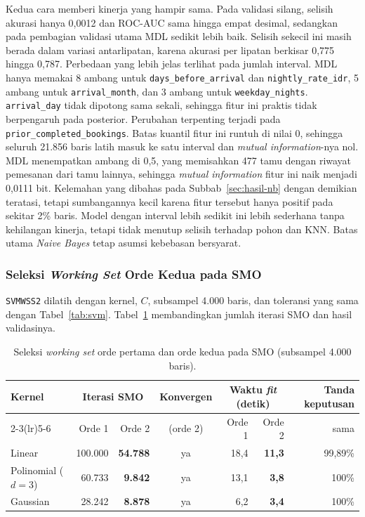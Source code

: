 Kedua cara memberi kinerja yang hampir sama. Pada validasi silang, selisih akurasi hanya 0,0012 dan ROC-AUC sama hingga empat desimal, sedangkan pada pembagian validasi utama MDL sedikit lebih baik. Selisih sekecil ini masih berada dalam variasi antarlipatan, karena akurasi per lipatan berkisar 0,775 hingga 0,787. Perbedaan yang lebih jelas terlihat pada jumlah interval. MDL hanya memakai 8 ambang untuk \texttt{days\_before\_arrival} dan \texttt{nightly\_rate\_idr}, 5 ambang untuk \texttt{arrival\_month}, dan 3 ambang untuk \texttt{weekday\_nights}. \texttt{arrival\_day} tidak dipotong sama sekali, sehingga fitur ini praktis tidak berpengaruh pada posterior. Perubahan terpenting terjadi pada \texttt{prior\_completed\_bookings}. Batas kuantil fitur ini runtuh di nilai 0, sehingga seluruh 21.856 baris latih masuk ke satu interval dan \textit{mutual information}-nya nol. MDL menempatkan ambang di 0,5, yang memisahkan 477 tamu dengan riwayat pemesanan dari tamu lainnya, sehingga \textit{mutual information} fitur ini naik menjadi 0,0111 bit. Kelemahan yang dibahas pada Subbab~\ref{sec:hasil-nb} dengan demikian teratasi, tetapi sumbangannya kecil karena fitur tersebut hanya positif pada sekitar 2\% baris. Model dengan interval lebih sedikit ini lebih sederhana tanpa kehilangan kinerja, tetapi tidak menutup selisih terhadap pohon dan KNN. Batas utama \textit{Naive Bayes} tetap asumsi kebebasan bersyarat.

\subsubsection{Seleksi \textit{Working Set} Orde Kedua pada SMO}
\texttt{SVMWSS2} dilatih dengan kernel, $C$, subsampel 4.000 baris, dan toleransi yang sama dengan Tabel~\ref{tab:svm}. Tabel~\ref{tab:svm-wss} membandingkan jumlah iterasi SMO dan hasil validasinya.

\begin{table}[htbp]
    \centering
    \small
    \begin{tabular}{@{}l r r c r r r@{}}
        \toprule
        Kernel & \multicolumn{2}{c}{Iterasi SMO} & Konvergen & \multicolumn{2}{c}{Waktu \textit{fit} (detik)} & Tanda keputusan \\
        \cmidrule(lr){2-3}\cmidrule(lr){5-6}
         & Orde 1 & Orde 2 & (orde 2) & Orde 1 & Orde 2 & sama \\
        \midrule
        Linear & 100.000 & \textbf{54.788} & ya & 18,4 & \textbf{11,3} & 99,89\% \\
        Polinomial ($d=3$) & 60.733 & \textbf{9.842} & ya & 13,1 & \textbf{3,8} & 100\% \\
        Gaussian & 28.242 & \textbf{8.878} & ya & 6,2 & \textbf{3,4} & 100\% \\
        \bottomrule
    \end{tabular}
    \caption{Seleksi \textit{working set} orde pertama dan orde kedua pada SMO (subsampel 4.000 baris).}
    \label{tab:svm-wss}
\end{table}

